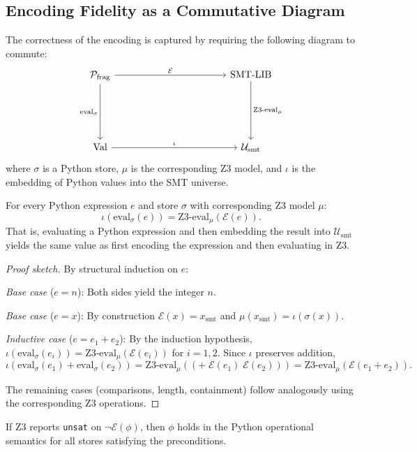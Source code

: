 \documentclass[11pt]{article}
\newcommand{\smtenc}{\mathcal{E}}
\newcommand{\PythonFrag}{\mathcal{P}_{\mathrm{frag}}}
\newcommand{\SmtUni}{\mathcal{U}_{\mathrm{smt}}}
\begin{document}
\subsection{Encoding Fidelity as a Commutative Diagram}

The correctness of the encoding is captured by requiring the following
diagram to commute:
\[
\begin{tikzcd}[column sep=4cm, row sep=2cm]
  \PythonFrag \arrow{r}{\smtenc} \arrow{d}[swap]{\text{eval}_{\sigma}} &
  \text{SMT-LIB} \arrow{d}{\text{Z3-eval}_{\mu}} \\
  \mathrm{Val} \arrow{r}{\iota} &
  \SmtUni
\end{tikzcd}
\]
where $\sigma$ is a Python store, $\mu$ is the corresponding Z3 model,
and $\iota$ is the embedding of Python values into the SMT universe.

\begin{theorem}[Adequacy]\label{thm:adequacy}
For every Python expression $e$ and store $\sigma$ with corresponding
Z3 model $\mu$:
\[
  \iota(\text{eval}_\sigma(e)) = \text{Z3-eval}_\mu(\smtenc(e)).
\]
That is, evaluating a Python expression and then embedding the result
into $\SmtUni$ yields the same value as first encoding the expression
and then evaluating in Z3.
\end{theorem}

\begin{proof}[Proof sketch]
By structural induction on $e$:

\emph{Base case} ($e = n$): Both sides yield the integer $n$.

\emph{Base case} ($e = x$): By construction $\smtenc(x) = x_{\mathrm{smt}}$
and $\mu(x_{\mathrm{smt}}) = \iota(\sigma(x))$.

\emph{Inductive case} ($e = e_1 + e_2$): By the induction hypothesis,
$\iota(\text{eval}_\sigma(e_i)) = \text{Z3-eval}_\mu(\smtenc(e_i))$ for
$i=1,2$.  Since $\iota$ preserves addition,
\[
  \iota(\text{eval}_\sigma(e_1) + \text{eval}_\sigma(e_2))
  = \text{Z3-eval}_\mu((\mathtt{+}\; \smtenc(e_1)\; \smtenc(e_2)))
  = \text{Z3-eval}_\mu(\smtenc(e_1 + e_2)).
\]

The remaining cases (comparisons, length, containment) follow
analogously using the corresponding Z3 operations.
\end{proof}

\begin{corollary}\label{cor:encoding-soundness}
If Z3 reports \texttt{unsat} on $\neg\smtenc(\phi)$, then $\phi$ holds
in the Python operational semantics for all stores satisfying the
preconditions.
\end{corollary}
\end{document}
